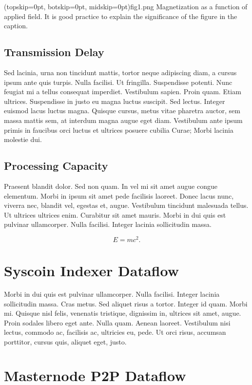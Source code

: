 \documentclass[peerreview]{ieeesyscoin}
\begin{document}
\Figure[t!](topskip=0pt, botskip=0pt, midskip=0pt){fig1.png}
{Magnetization as a function of applied field.
It is good practice to explain the significance of the figure in the caption.\label{fig1}}

\subsection{Transmission Delay}
Sed lacinia, urna non tincidunt mattis, tortor neque adipiscing diam, a cursus ipsum ante quis turpis. Nulla facilisi. Ut fringilla. Suspendisse potenti. Nunc feugiat mi a tellus consequat imperdiet. Vestibulum sapien. Proin quam. Etiam ultrices. Suspendisse in justo eu magna luctus suscipit. Sed lectus. Integer euismod lacus luctus magna. Quisque cursus, metus vitae pharetra auctor, sem massa mattis sem, at interdum magna augue eget diam. Vestibulum ante ipsum primis in faucibus orci luctus et ultrices posuere cubilia Curae; Morbi lacinia molestie dui. 

\subsection{Processing Capacity}
Praesent blandit dolor. Sed non quam. In vel mi sit amet augue congue elementum. Morbi in ipsum sit amet pede facilisis laoreet. Donec lacus nunc, viverra nec, blandit vel, egestas et, augue. Vestibulum tincidunt malesuada tellus. Ut ultrices ultrices enim. Curabitur sit amet mauris. Morbi in dui quis est pulvinar ullamcorper. Nulla facilisi. Integer lacinia sollicitudin massa. 

\begin{equation}E=mc^2.\label{eq}\end{equation}


\section{Syscoin Indexer Dataflow}

Morbi in dui quis est pulvinar ullamcorper. Nulla facilisi. Integer lacinia sollicitudin massa. Cras metus. Sed aliquet risus a tortor. Integer id quam. Morbi mi. Quisque nisl felis, venenatis tristique, dignissim in, ultrices sit amet, augue. Proin sodales libero eget ante. Nulla quam. Aenean laoreet. Vestibulum nisi lectus, commodo ac, facilisis ac, ultricies eu, pede. Ut orci risus, accumsan porttitor, cursus quis, aliquet eget, justo. 

\section{Masternode P2P Dataflow}
\end{document}
